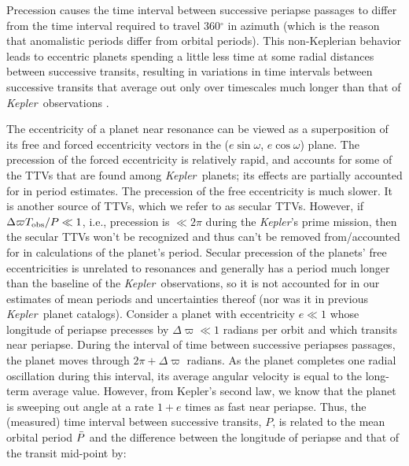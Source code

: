 \documentclass{aastex62}
\newcommand{\ikt}{{\it Kepler}}
\newcommand{\ik}{{\it Kepler~}}
\begin{document}
Precession causes the time interval between successive periapse passages to differ from the time interval required to travel 360$^\circ$ in azimuth (which is the reason that anomalistic periods differ from orbital periods).  This non-Keplerian behavior leads to eccentric planets spending a little less time at some radial distances between successive transits, resulting in variations in time intervals between successive transits that average out only over timescales much longer than that of \ik observations \citep{Agol:2005}. 


The eccentricity of a planet near resonance can be viewed as a superposition of its free and forced eccentricity vectors in the ($e \sin \omega$, $e \cos \omega$) plane.  The precession of the forced eccentricity is relatively rapid, and accounts for some of the TTVs that are found among \ik planets; its effects are partially accounted for in period estimates.  The precession of the free eccentricity is much slower.  It is another source of TTVs, which we refer to as secular TTVs.  However, if $ \Delta \varpi T_{\rm obs}/P \ll 1$, i.e., precession is $\ll 2\pi$ during the \ikt's prime mission, then the secular TTVs won't be recognized  and thus can't be removed from/accounted for in calculations of the planet's period. 
Secular precession of the planets' free eccentricities is unrelated to resonances and generally has a period much longer than the baseline of the \ik observations, so it is not accounted for in our estimates of mean periods and uncertainties thereof (nor was it in previous \ik planet catalogs). 
Consider a planet with eccentricity $e \ll 1$ whose longitude of periapse precesses by $\Delta \varpi \ll 1$ radians per orbit and which transits near periapse.  During the interval of time between successive periapses passages, the planet moves through $2\pi+\Delta \varpi$ radians.  As the planet completes one radial oscillation during this interval, its average angular velocity is equal to the long-term average value.  However, from Kepler's second law, we know that the planet is sweeping out angle at a rate $1+e$ times as fast near periapse.  Thus, the (measured) time interval between successive transits, $P$, is related to the mean orbital period $\Bar{P}$ and the difference between the longitude of periapse and that of the transit mid-point by:
\end{document}

